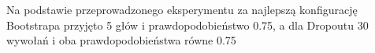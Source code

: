 \begin{figure}[H]
	\begin{floatrow}
	\end{floatrow}
\end{figure}

Na podstawie przeprowadzonego eksperymentu za najlepszą konfigurację Bootstrapa przyjęto 5 głów i prawdopodobieństwo 0.75, a dla Dropoutu 30 wywołań i oba prawdopodobieństwa równe 0.75

